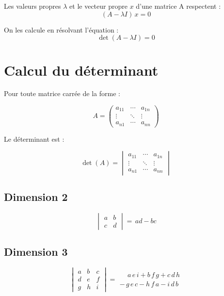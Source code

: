 Les valeurs propres $\lambda$ et le vecteur propre $x$ d'une matrice A respectent :
\begin{equation*}
(A - \lambda I) \, x = 0
\end{equation*}

On les calcule en résolvant l'équation :
\begin{equation*}
\det(A - \lambda I) = 0
\end{equation*}


\section{Calcul du déterminant}

Pour toute matrice carrée de la forme : 

\begin{equation*}
A = \begin{pmatrix} a_{11} & \cdots & a_{1n} \\ \vdots & \ddots & \vdots \\ a_{n1} & \cdots & a_{nn} \end{pmatrix}
\end{equation*}

Le déterminant est :

\begin{equation*}
\det(A) = \begin{vmatrix} a_{11} & \cdots & a_{1n} \\ \vdots & \ddots & \vdots \\ a_{n1} & \cdots & a_{nn} \end{vmatrix}
\end{equation*}


\subsection{Dimension 2}

\begin{equation*}
\begin{vmatrix}a&b\\c&d\end{vmatrix} = \, ad - bc
\end{equation*}


\subsection{Dimension 3}

\begin{equation*}
\begin{vmatrix}a&b&c\\d&e&f\\g&h&i\end{vmatrix} =
\begin{array}{cc}
\, \, \, \, \, \, \, a \, e \, i + b \, f \, g + c \, d \, h\\
- \, g \, e \, c - h \, f \, a - i \, d \, b
\end{array}
\end{equation*}


